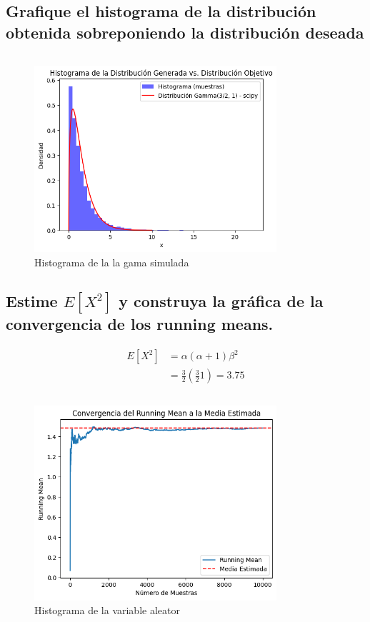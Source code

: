 \documentclass{article}
\begin{document}
\subsection{Grafique el histograma de la distribución obtenida sobreponiendo la distribución deseada}
\begin{pythonbox}
	\inputminted{python}{code/accept_graph.py}
\end{pythonbox}
\begin{figure}[H]
	\centering
	\includegraphics[width=0.8\textwidth]{assets/gamma.png}
	\caption{Histograma de la la gama simulada}
\end{figure}


\subsection{Estime $E[X^2]$ y construya la gráfica de la convergencia de los running means.}

\[
	\begin{split}
		E[X^2] & = \alpha(\alpha + 1)\beta^2      \\
		       & = \frac{3}{2}(\frac{3}{2}1)=3.75
	\end{split}
\]
\begin{pythonbox}[title={The }]
	\inputminted{python}{code/test.py}
\end{pythonbox}

\begin{figure}[H]
	\centering
	\includegraphics[width=0.8\textwidth]{assets/gama_sum.png}
	\caption{Histograma de la variable aleator}
\end{figure}
\end{document}
